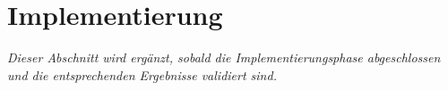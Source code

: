 \section{Implementierung}\label{implementierung}

\textit{Dieser Abschnitt wird ergänzt, sobald die Implementierungsphase abgeschlossen und die entsprechenden Ergebnisse validiert sind.}
